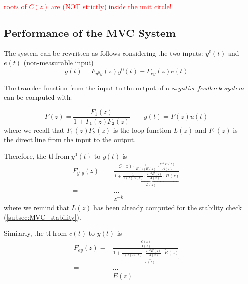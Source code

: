 \textcolor{red}{\large roots of $C(z)$ are (NOT strictly) inside the unit circle!}

\subsection{Performance of the MVC System}\label{subsec:MVC_performance}

The system can be rewritten as follows considering the two inputs: $y^0(t)$ and $e(t)$ (non-measurable input)
\[ 
	y(t) = F_{y^0y}(z) y^0(t) + F_{ey}(z) e(t)
\]

\begin{recall}
    The transfer function from the input to the output of a \emph{negative feedback system} can be computed with:
    \begin{figure}[H]
        \centering
    \end{figure}

    \[ 
    	F(z) = \frac{F_1(z)}{1 + F_1(z) F_2(z)} \qquad y(t) = F(z) u(t)
    \]
    where we recall that $F_1(z) F_2(z)$ is the loop-function $L(z)$
 	and $F_1(z)$ is the direct line from the input to the output.
\end{recall}

Therefore, the \gls{tf} from $y^0(t)$ to $y(t)$ is
\begin{align*}
	F_{y^0y}(z) =& \frac{C(z) \cdot \frac{1}{B(z) E(z)} \cdot \frac{z^{-k} B(z)}{A(z)}}{1 + \underbrace{\frac{1}{B(z)E(z)}\cdot \frac{z^{-k}B(z)}{A(z)}\cdot\tilde{R}(z)}_{L(z)}} \\
	=& \dots \\
	=& z^{-k}
\end{align*}
where we remind that $L(z)$ has been already computed for the stability check (\ref{subsec:MVC_stability}). 

Similarly, the \gls{tf} from $e(t)$ to $y(t)$ is 
\begin{align*}
	F_{ey}(z) =& \frac{\frac{C(z)}{A(z)}}{1 + \underbrace{\frac{1}{B(z)E(z)}\cdot \frac{z^{-k}B(z)}{A(z)}\cdot\tilde{R}(z)}_{L(z)}} \\
	=& \dots \\
	=& E(z)
\end{align*}

